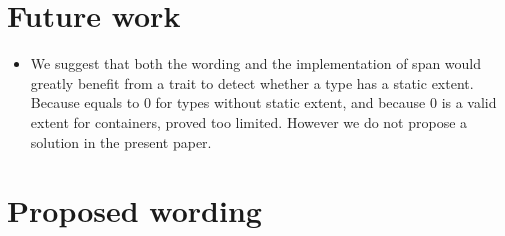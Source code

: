 \documentclass{wg21}
\begin{document}
\section{Future work}

\begin{itemize}
	\item We suggest that both the wording and the implementation of span would greatly benefit from a trait to detect whether a type has a static extent.
Because  equals to 0 for types without static extent, and because 0 is a valid extent for containers,  proved too limited. However we do not propose a solution in the present paper. 
\end{itemize}

\section{Proposed wording}
\end{document}
